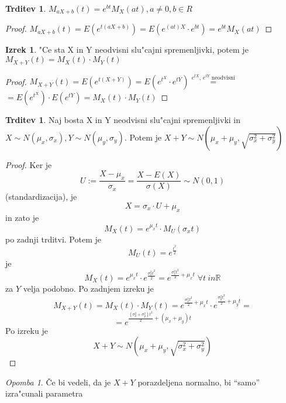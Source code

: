 \documentclass[a4paper,12pt]{article}
\theoremstyle{definition}
\newtheorem{claim}[counter]{Trditev}
\newtheorem{theorem}[counter]{Izrek}
\theoremstyle{remark}
\newtheorem*{rem}{Opomba}
\newcommand{\R}{\mathbb{R}}
\begin{document}
\begin{claim}
    $M_{aX+b}(t) = e^{bt} M_X(at), a \neq 0, b \in R$
\end{claim}

\begin{proof}
    $M_{aX+b}(t) = E(e^{t(aX+b)}) = E(e^{(at)X} \cdot e^{bt}) = e^{bt} M_X(at)$
\end{proof}

\begin{theorem}
    "Ce sta X in Y neodvisni slu"cajni spremenljivki, potem je $M_{X+Y}(t) = M_X(t) \cdot M_Y(t)$
\end{theorem}

\begin{proof}
    $M_{X+Y}(t) = E(e^{t(X+Y)}) = E(e^{t^X} \cdot e^{tY}) \stackrel{\text{$e^{tX}$, $e^{tY}$ neodvisni}}{=} $ \\
    $= E(e^{t^X}) \cdot E(e^{tY}) = M_X(t) \cdot M_Y(t)$
\end{proof}

\begin{claim}
    Naj bosta X in Y neodvisni slu"cajni spremenljivki in $X \sim N(\mu_x, \sigma_x), Y \sim N(\mu_y, \sigma_y)$.
    Potem je $X + Y \sim N(\mu_x + \mu_y, \sqrt{\sigma_x^2 + \sigma_y^2})$
\end{claim}

\begin{proof}
    Ker je
    \[U := \frac{X-\mu_x}{\sigma_x} = \frac{X-E(X)}{\sigma(X)} \sim N(0,1)\]
    (standardizacija), je
    \[X = \sigma_x \cdot U + \mu_x\]
    in zato je
    \[M_X(t) = e^{\mu_x t} \cdot M_U(\sigma_x t)\]
    po zadnji trditvi. Potem je
    \[M_U(t) = e^{\frac{t^2}{2}}\]
    je
    \[M_X(t) = e^{\mu_x t} \cdot e^{\frac{\sigma_x^2 t^2}{2}} = e^{\frac{\sigma_x^2 t^2}{2} + \mu_x t} \; \forall t \ in \R\]
    za $Y$ velja podobno. Po zadnjem izreku je
    \[M_{X+Y}(t) = M_X(t) \cdot M_Y(t) = e^{\frac{\sigma_x^2 t^2}{2} + \mu_x t} \cdot e^{\frac{\sigma_y^2 t^2}{2} + \mu_y t} =\]
    \[= e^{\frac{(\sigma_x^2 + \sigma_y^2) t^2}{2} + (\mu_x + \mu_y) t}\]
    Po izreku je
    \[X + Y \sim N(\mu_x+\mu_y, \sqrt{\sigma_x^2 + \sigma_y^2})\]
\end{proof}

\begin{rem}
    Če bi vedeli, da je $X + Y$ porazdeljena normalno, bi ``samo'' izra"cunali parametra %
\end{rem}
\end{document}
